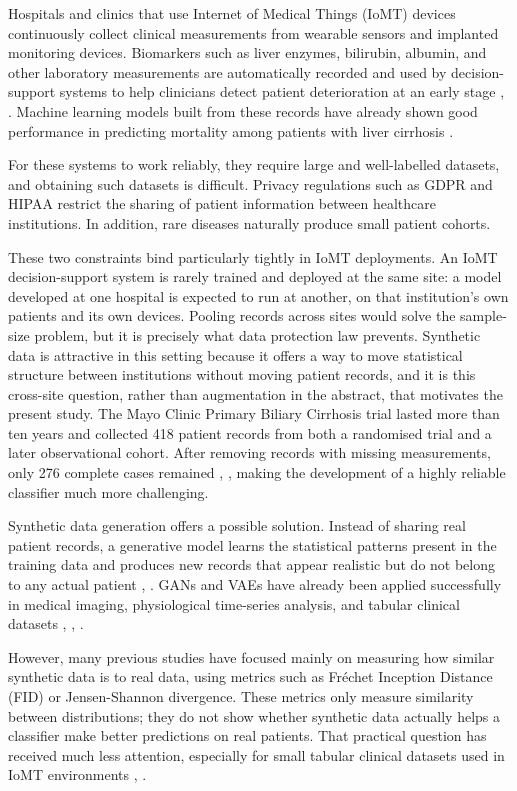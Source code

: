 \documentclass[journal]{IEEEtran}
\begin{document}
Hospitals and clinics that use Internet of Medical Things (IoMT) devices continuously collect clinical measurements from wearable sensors and implanted monitoring devices. Biomarkers such as liver enzymes, bilirubin, albumin, and other laboratory measurements are automatically recorded and used by decision-support systems to help clinicians detect patient deterioration at an early stage \cite{guo2021}, \cite{obeid2023}. Machine learning models built from these records have already shown good performance in predicting mortality among patients with liver cirrhosis \cite{kanwal2020}.

For these systems to work reliably, they require large and well-labelled datasets, and obtaining such datasets is difficult. Privacy regulations such as GDPR and HIPAA restrict the sharing of patient information between healthcare institutions. In addition, rare diseases naturally produce small patient cohorts.

These two constraints bind particularly tightly in IoMT deployments. An IoMT decision-support system is rarely trained and deployed at the same site: a model developed at one hospital is expected to run at another, on that institution's own patients and its own devices. Pooling records across sites would solve the sample-size problem, but it is precisely what data protection law prevents. Synthetic data is attractive in this setting because it offers a way to move statistical structure between institutions without moving patient records, and it is this cross-site question, rather than augmentation in the abstract, that motivates the present study. The Mayo Clinic Primary Biliary Cirrhosis trial lasted more than ten years and collected 418 patient records from both a randomised trial and a later observational cohort. After removing records with missing measurements, only 276 complete cases remained \cite{fleming1991}, \cite{ucipbc}, making the development of a highly reliable classifier much more challenging.

Synthetic data generation offers a possible solution. Instead of sharing real patient records, a generative model learns the statistical patterns present in the training data and produces new records that appear realistic but do not belong to any actual patient \cite{goncalves2020}, \cite{gonzales2023}. GANs and VAEs have already been applied successfully in medical imaging, physiological time-series analysis, and tabular clinical datasets \cite{yan2022}, \cite{nikolentzos2023}, \cite{che2017}.

However, many previous studies have focused mainly on measuring how similar synthetic data is to real data, using metrics such as Fr\'{e}chet Inception Distance (FID) or Jensen-Shannon divergence. These metrics only measure similarity between distributions; they do not show whether synthetic data actually helps a classifier make better predictions on real patients. That practical question has received much less attention, especially for small tabular clinical datasets used in IoMT environments \cite{kababji2023}, \cite{espinosa2023}.
\end{document}
